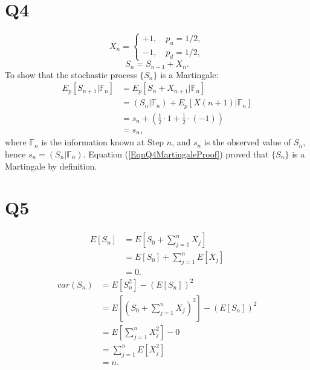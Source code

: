 \documentclass[final,3p,times]{elsarticle}
\begin{document}
\section{Q4}
	\begin{equation}
		X_n=
		\begin{cases}
			+1, \quad p_u=1/2, \\
			-1, \quad p_d=1/2,
		\end{cases}
	\end{equation}
	\begin{equation}
		S_n=S_{n-1}+X_n.
	\end{equation}
	To show that the stochastic process $\{S_n\}$ is a Martingale:
	\begin{equation}
		\label{EqnQ4MartingaleProof}
		\begin{split}
			E_p[S_{n+1}|\mathbb{F}_n] &= E_p[S_n+X_{n+1}|\mathbb{F}_n] \\
			&= \left(S_n|\mathbb{F}_n\right) + E_p[X(n+1)|\mathbb{F}_n] \\
			&= s_n + \left(\frac{1}{2}\cdot 1+\frac{1}{2}\cdot (-1)\right) \\
			&= s_n
			,
		\end{split}
	\end{equation}
	where $\mathbb{F}_n$ is the information known at Step $n$, and $s_n$ is the observed value of $S_n$, hence $s_n = \left(S_n|\mathbb{F}_n\right)$. Equation (\ref{EqnQ4MartingaleProof}) proved that $\{S_n\}$ is a Martingale by definition.
	
\section{Q5}
	\begin{equation}
		\begin{split}
			E[S_n]&=E[S_0+\sum_{j=1}^{n} X_j] \\
			&=E[S_0]+\sum_{j=1}^{n} E[X_j] \\
			&=0
			.
		\end{split}
	\end{equation}
	\begin{equation}
		\begin{split}
			var(S_n)&=E[S_n^2]-\left(E[S_n]\right)^2 \\
			&=E[\left(S_0+\sum_{j=1}^{n}X_j\right)^2]-\left(E[S_n]\right)^2 \\
			&=E[\sum_{j=1}^{n} X_j^2] - 0 \\
			&=\sum_{j=1}^{n} E[X_j^2] \\
			&= n
			.
		\end{split}
	\end{equation}
	
\end{document}
